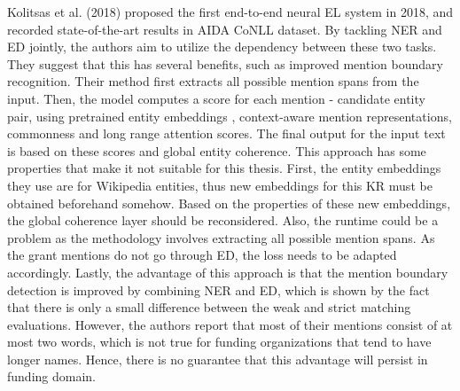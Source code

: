 \documentclass{report}
\theoremstyle{definition}
\theoremstyle{remark}
\begin{document}
Kolitsas et al. (2018) \cite{kolitsas} proposed the first end-to-end neural EL system in 2018, and recorded state-of-the-art results in AIDA CoNLL dataset. By tackling NER and ED jointly, the authors aim to utilize the dependency between these two tasks. They suggest that this has several benefits, such as improved mention boundary recognition. Their method first extracts all possible mention spans from the input. Then, the model computes a score for each mention - candidate entity pair, using pretrained entity embeddings \cite{kolitsasEmbed}, context-aware mention representations, commonness and long range attention scores. The final output for the input text is based on these scores and global entity coherence. This approach has some properties that make it not suitable for this thesis. First, the entity embeddings they use are for Wikipedia entities, thus new embeddings for this KR must be obtained beforehand somehow. Based on the properties of these new embeddings, the global coherence layer should be reconsidered. Also, the runtime could be a problem as the methodology involves extracting all possible mention spans. As the grant mentions do not go through ED, the loss needs to be adapted accordingly. Lastly, the advantage of this approach is that the mention boundary detection is improved by combining NER and ED, which is shown by the fact that there is only a small difference between the weak and strict matching evaluations. However, the authors report that most of their mentions consist of at most two words, which is not true for funding organizations that tend to have longer names. Hence, there is no guarantee that this advantage will persist in funding domain.
\end{document}
